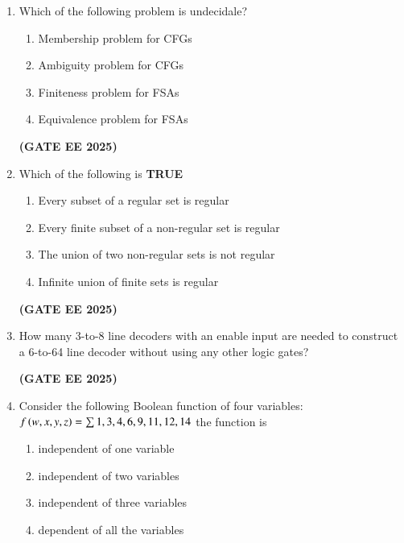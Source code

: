 \documentclass[journal,12pt,onecolumn]{IEEEtran}
\theoremstyle{remark}
\begin{document}
\begin {center}
\begin{enumerate}
\item  Which of the following problem is undecidale? 
\begin{enumerate}

    \item  Membership problem for CFGs
    \item Ambiguity problem for CFGs
    \item Finiteness problem for FSAs
    \item Equivalence problem for FSAs

\end{enumerate}
\hfill \textbf{(GATE EE 2025)}

 
\item   Which of the following is \textbf{TRUE}
\begin{enumerate}

    \item Every subset of a regular set is regular
    \item Every finite subset of a non-regular set is regular
    \item The union of two non-regular sets is not regular
    \item Infinite union of finite sets is regular

\end{enumerate}
\hfill \textbf{(GATE EE 2025)}
\item    How many 3-to-8 line decoders with an enable input are needed to  construct a 6-to-64 line decoder without using any other logic gates?
\begin{enumerate}
\end{enumerate}
\hfill \textbf{(GATE EE 2025)}
\item    Consider the following Boolean function of four variables:
\newline
 $f\left(w,x,y,z\right)=\sum{1,3,4,6,9,11,12,14}$
 \newline
      the function is
\begin{enumerate}

    \item  independent of one variable
    \item  independent of two variables
    \item  independent of three variables
    \item  dependent of all the variables 


\end{enumerate}
\end{enumerate}
\end{center}
\end{document}
